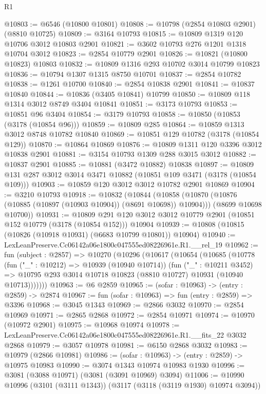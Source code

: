 \begin{lexlean}{R1}
\begin{coremodule}
@10803 := @6546 (@10800 @10801)
@10808 := @10798 (@2854 @10803 @2901) (@8810 @10725)
@10809 := @3164 @10793
@10815 := @10809 @1319 @120 @10706 @3012 @10803 @2901
@10821 := @3602 @10793 @276 @1201 @1318 @10704 @3012
@10823 := @2854 @10779 @2901
@10826 := @10821 (@10800 @10823) @10803
@10832 := @10809 @1316 @293 @10702 @3014 @10799 @10823
@10836 := @10794 @1307 @1315 @8750 @10701
@10837 := @2854 @10782
@10838 := @1261 @10700
@10840 := @2854 @10838 @2901
@10841 := @10837 @10840
@10844 := @10836 (@3405 @10841) @10799
@10850 := @10809 @118 @1314 @3012 @8749 @3404 @10841
@10851 := @3173 @10793
@10853 := @10851 @96 @3404
@10854 := @3179 @10793
@10858 := @10850 (@10853 (@3178 (@10854 @96)))
@10859 := @10809 @285
@10864 := @10859 @1313 @3012 @8748 @10782 @10840
@10869 := @10851 @129 @10782 (@3178 (@10854 @129))
@10870 := @10864 @10869
@10876 := @10809 @1311 @120 @3396 @3012 @10838 @2901
@10881 := @3154 @10793 @1309 @288 @3015 @3012
@10882 := @10837 @2901
@10885 := @10881 (@3472 @10882) @10838
@10897 := @10809 @131 @287 @3012 @3014 @3471 @10882 (@10851 @109 @3471 (@3178 (@10854 @109)))
@10903 := @10859 @120 @3012 @3012 @10782 @2901 @10869
@10904 := @3210 @10793
@10918 := @10832
    (@10844
      (@10858 (@10870 (@10876 (@10885 (@10897 (@10903 @10904)) (@8691 @10698)) @10904)))
      (@8699 @10698 @10700))
@10931 := @10809
    @291
    @120
    @3012
    @3012
    @10779
    @2901
    (@10851 @152 @10779 (@3178 (@10854 @152)))
    @10904
@10939 := @10808 (@10815 (@10826 (@10918 @10931) (@6683 @10799 @10801)) @10904)
@10940 := LexLeanPreserve.Cc06142a06e1800c047555ed08226961e.R1.__rel_19
@10962 := fun (subject : @2857) =>
  @10270
    (@10296
      (@10617
        (@10654
          (@10685
            (@10778
              (fun ("_" : @10212) => @10939 (@10940 @10714))
              (fun ("_" : @10211 @3452) =>
              @10795 @293 @3014 @10718 @10823 (@8810 @10727) @10931 (@10940 @10713)))))))
@10963 := @6 @2859
@10965 := (sofar : @10963) -> (entry : @2859) -> @2874
@10967 := fun (sofar : @10963) => fun (entry : @2859) => @3396
@10968 := @3045 @1343
@10969 := @2866 @3032
@10970 := @2854 @10969
@10971 := @2865 @2868
@10972 := @2854 @10971
@10974 := @10970 (@10972 @2901)
@10975 := @10968 @10974
@10978 := LexLeanPreserve.Cc06142a06e1800c047555ed08226961e.R1.__fits_22 @3032 @2868
@10979 := @3057 @10978
@10981 := @6150 @2868 @3032
@10983 := @10979 (@2866 @10981)
@10986 := (sofar : @10963) -> (entry : @2859) -> @10975 @10983
@10990 := @3074 @1343 @10974 @10983 @1930
@10996 := @3081 (@3088 @10971) (@3081 (@3091 @10969) @3094)
@11006 := @10990 @10996 (@3101 (@3111 @1343)) (@3117 (@3118 (@3119 @1930) @10974 @3094))

\end{coremodule}
\end{lexlean}
